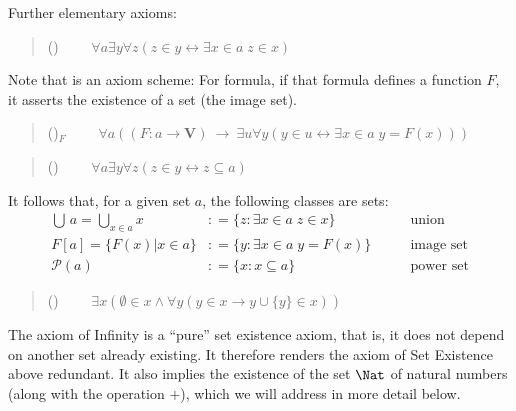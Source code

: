 \documentclass[letterpaper,10pt,english]{jupyterBook}
\begin{document}
\sphinxAtStartPar
Further elementary axioms:
\begin{quote}

\sphinxAtStartPar
()   \(\qquad \forall a \exists y \forall z (z \in y  \leftrightarrow  \exists x \in a \; z \in x)\)
\end{quote}

\begin{sphinxShadowBox}
\sphinxstylesidebartitle{}

\sphinxAtStartPar
Note that  is an axiom scheme: For  formula, if that formula defines a function \(F\), it asserts the existence of a set (the image set).
\end{sphinxShadowBox}
\begin{quote}

\sphinxAtStartPar
()\(_F\) 
\(\qquad \forall a  ((F: a \to \mathbf{V}) \: \rightarrow \: \exists u \forall y (y \in u \leftrightarrow \exists x \in a \; y = F(x)))\)
\end{quote}
\begin{quote}

\sphinxAtStartPar
() \(\qquad \forall a \exists y \forall z (z \in y \leftrightarrow z \subseteq a)\)
\end{quote}

\sphinxAtStartPar
It follows that, for a given set \(a\), the following classes are sets:
\begin{align*}
\bigcup \, a = \bigcup_{x \in a} x & : = \{z \colon \exists x \in a \; z \in x \}  &  \qquad  \text{union}\\
F[a] = \{F(x)|x \in a\} &: = \{y\colon \exists x \in a \; y = F(x) \}  &  \qquad  \text{image set}\\
\mathcal{P}(a) &: = \{x\colon x \subseteq a\} & \qquad  \text{power set}
\end{align*}\begin{quote}

\sphinxAtStartPar
() \( \qquad \exists x ( \emptyset \in x \wedge \forall y ( y \in x \to y \cup \{y\} \in x))\)
\end{quote}

\sphinxAtStartPar
The axiom of Infinity is a “pure” set existence axiom, that is, it does not depend on another set already existing. It therefore renders the axiom of Set Existence above redundant.
It also implies the existence of the set \(\Nat\) of natural numbers (along with the operation \(+\)), which we will address in more detail below.
\end{document}
